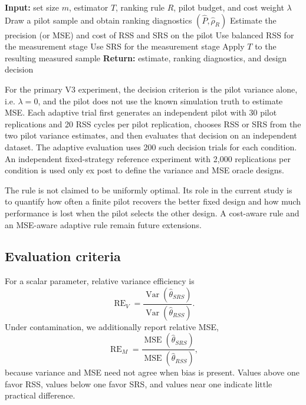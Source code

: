 \documentclass[12pt]{article}
\begin{document}
\begin{algorithm}[H]
\caption{Adaptive RSS--SRS Robust Estimation}
\label{alg:adaptive_rss}
\begin{algorithmic}[1]
\State \textbf{Input:} set size $m$, estimator $T$, ranking rule $R$, pilot budget, and cost weight $\lambda$
\State Draw a pilot sample and obtain ranking diagnostics $(\widehat P,\widehat\rho_R)$
\State Estimate the precision (or MSE) and cost of RSS and SRS on the pilot
    \State Use balanced RSS for the measurement stage
\Else
    \State Use SRS for the measurement stage
\EndIf
\State Apply $T$ to the resulting measured sample
\State \textbf{Return:} estimate, ranking diagnostics, and design decision
\end{algorithmic}
\end{algorithm}

For the primary V3 experiment, the decision criterion is the pilot variance alone, i.e.
$\lambda=0$, and the pilot does not use the known simulation truth to estimate MSE. Each adaptive trial first generates an independent pilot with 30 pilot replications and 20 RSS cycles per pilot replication, chooses RSS or SRS from the two pilot variance estimates, and then evaluates that decision on an independent dataset. The adaptive evaluation uses 200 such decision trials for each condition. An independent fixed-strategy reference experiment with 2,000 replications per condition is used only ex post to define the variance and MSE oracle designs.

The rule is not claimed to be uniformly optimal. Its role in the current study is to quantify how often a finite pilot recovers the better fixed design and how much performance is lost when the pilot selects the other design. A cost-aware rule and an MSE-aware adaptive rule remain future extensions.

\subsection{Evaluation criteria}
For a scalar parameter, relative variance efficiency is
\[
\operatorname{RE}_{V}=\frac{\operatorname{Var}(\widehat\theta_{SRS})}
{\operatorname{Var}(\widehat\theta_{RSS})}.
\]
Under contamination, we additionally report relative MSE,
\[
\operatorname{RE}_{M}=\frac{\operatorname{MSE}(\widehat\theta_{SRS})}
{\operatorname{MSE}(\widehat\theta_{RSS})},
\]
because variance and MSE need not agree when bias is present. Values above one favor RSS, values below one favor SRS, and values near one indicate little practical difference.
\end{document}
